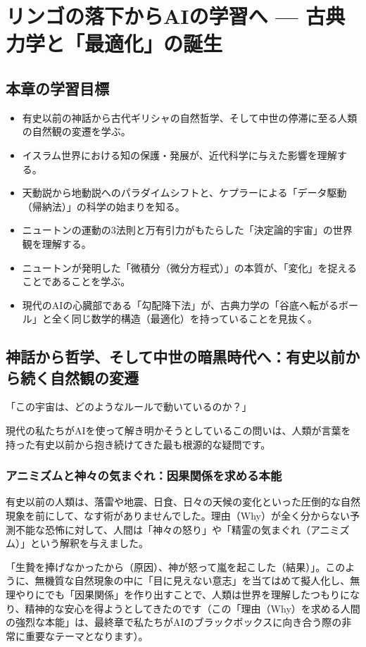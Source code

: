 \chapter{リンゴの落下からAIの学習へ --- 古典力学と「最適化」の誕生}

\section*{本章の学習目標}
\begin{itemize}
\item 有史以前の神話から古代ギリシャの自然哲学、そして中世の停滞に至る人類の自然観の変遷を学ぶ。
\item イスラム世界における知の保護・発展が、近代科学に与えた影響を理解する。
\item 天動説から地動説へのパラダイムシフトと、ケプラーによる「データ駆動（帰納法）」の科学の始まりを知る。
\item ニュートンの運動の3法則と万有引力がもたらした「決定論的宇宙」の世界観を理解する。
\item ニュートンが発明した「微積分（微分方程式）」の本質が、「変化」を捉えることであることを学ぶ。
\item 現代のAIの心臓部である「勾配降下法」が、古典力学の「谷底へ転がるボール」と全く同じ数学的構造（最適化）を持っていることを見抜く。
\end{itemize}

\section{神話から哲学、そして中世の暗黒時代へ：有史以前から続く自然観の変遷}

「この宇宙は、どのようなルールで動いているのか？」

現代の私たちがAIを使って解き明かそうとしているこの問いは、人類が言葉を持った有史以前から抱き続けてきた最も根源的な疑問です。

\subsection{アニミズムと神々の気まぐれ：因果関係を求める本能}

有史以前の人類は、落雷や地震、日食、日々の天候の変化といった圧倒的な自然現象を前にして、なす術がありませんでした。理由（Why）が全く分からない予測不能な恐怖に対して、人間は「神々の怒り」や「精霊の気まぐれ（アニミズム）」という解釈を与えました。

「生贄を捧げなかったから（原因）、神が怒って嵐を起こした（結果）」。このように、無機質な自然現象の中に「目に見えない意志」を当てはめて擬人化し、無理やりにでも「因果関係」を作り出すことで、人類は世界を理解したつもりになり、精神的な安心を得ようとしてきたのです（この「理由（Why）を求める人間の強烈な本能」は、最終章で私たちがAIのブラックボックスに向き合う際の非常に重要なテーマとなります）。

